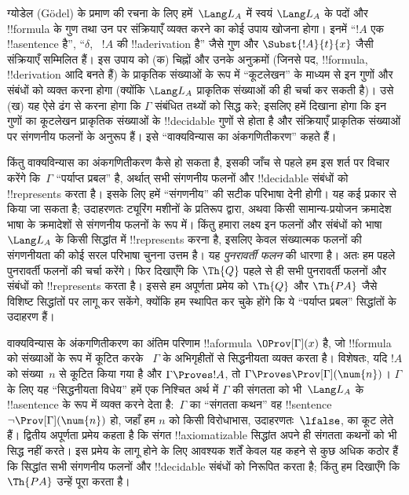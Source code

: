 \documentclass[../../../include/open-logic-section]{subfiles}
\begin{document}
ग्योडेल (G\"odel) के प्रमाण की रचना के लिए हमें~$\Lang L_A$ में स्वयं
$\Lang L_A$ के पदों और !!{formula} के गुण तथा उन पर संक्रियाएँ व्यक्त करने
का कोई उपाय खोजना होगा। इनमें ``$!A$ एक !!a{sentence} है'', ``$\delta$,
~$!A$ की !!a{derivation} है'' जैसे गुण और $\Subst{!A}{t}{x}$ जैसी संक्रियाएँ
सम्मिलित हैं। इस उपाय को (क) चिह्नों और उनके अनुक्रमों (जिनसे पद, !!{formula},
!!{derivation} आदि बनते हैं) के प्राकृतिक संख्याओं के रूप में ``कूटलेखन'' के
माध्यम से इन गुणों और संबंधों को व्यक्त करना होगा (क्योंकि $\Lang L_A$
प्राकृतिक संख्याओं की ही चर्चा कर सकती है)। उसे (ख) यह ऐसे ढंग से करना होगा
कि $\Gamma$ संबंधित तथ्यों को सिद्ध करे; इसलिए हमें दिखाना होगा कि इन गुणों का
कूटलेखन प्राकृतिक संख्याओं के !!{decidable} गुणों से होता है और संक्रियाएँ
प्राकृतिक संख्याओं पर संगणनीय फलनों के अनुरूप हैं। इसे ``वाक्यविन्यास का
अंकगणितीकरण'' कहते हैं।

किंतु वाक्यविन्यास का अंकगणितीकरण कैसे हो सकता है, इसकी जाँच से पहले हम इस
शर्त पर विचार करेंगे कि~$\Gamma$ ``पर्याप्त प्रबल'' है, अर्थात् सभी संगणनीय
फलनों और !!{decidable} संबंधों को !!{represents} करता है। इसके लिए हमें
``संगणनीय'' की सटीक परिभाषा देनी होगी। यह कई प्रकार से किया जा सकता है;
उदाहरणतः ट्यूरिंग मशीनों के प्रतिरूप द्वारा, अथवा किसी सामान्य-प्रयोजन
क्रमादेश भाषा के क्रमादेशों से संगणनीय फलनों के रूप में। किंतु हमारा लक्ष्य
इन फलनों और संबंधों को भाषा~$\Lang L_A$ के किसी सिद्धांत में !!{represents}
करना है, इसलिए केवल संख्यात्मक फलनों की संगणनीयता की कोई सरल परिभाषा चुनना
उत्तम है। यह \emph{पुनरावर्ती फलन} की धारणा है। अतः हम पहले पुनरावर्ती फलनों
की चर्चा करेंगे। फिर दिखाएँगे कि $\Th{Q}$ पहले से ही सभी पुनरावर्ती फलनों और
संबंधों को !!{represents} करता है। इससे हम अपूर्णता प्रमेय को $\Th{Q}$ और
$\Th{PA}$ जैसे विशिष्ट सिद्धांतों पर लागू कर सकेंगे, क्योंकि हम स्थापित कर
चुके होंगे कि ये ``पर्याप्त प्रबल'' सिद्धांतों के उदाहरण हैं।

वाक्यविन्यास के अंकगणितीकरण का अंतिम परिणाम !!a{formula}
$\OProv[\Gamma](x)$ है, जो !!{formula} को संख्याओं के रूप में कूटित करके
~$\Gamma$ के अभिगृहीतों से सिद्धनीयता व्यक्त करता है। विशेषतः, यदि $!A$ को
संख्या~$n$ से कूटित किया गया है और $\Gamma \Proves !A$, तो $\Gamma \Proves
\Prov[\Gamma](\num{n})$। $\Gamma$ के लिए यह ``सिद्धनीयता विधेय'' हमें एक
निश्चित अर्थ में $\Gamma$ की संगतता को भी~$\Lang L_A$ के !!a{sentence} के रूप
में व्यक्त करने देता है:~$\Gamma$ का ``संगतता कथन'' वह !!{sentence} $\lnot
\Prov[\Gamma](\num{n})$ हो, जहाँ हम $n$ को किसी विरोधाभास, उदाहरणतः~$\lfalse$,
का कूट लेते हैं। द्वितीय अपूर्णता प्रमेय कहता है कि संगत !!{axiomatizable}
सिद्धांत अपने ही संगतता कथनों को भी सिद्ध नहीं करते। इस प्रमेय के लागू होने
के लिए आवश्यक शर्तें केवल यह कहने से कुछ अधिक कठोर हैं कि सिद्धांत सभी
संगणनीय फलनों और !!{decidable} संबंधों को निरूपित करता है; किंतु हम दिखाएँगे
कि $\Th{PA}$ उन्हें पूरा करता है।
\end{document}
